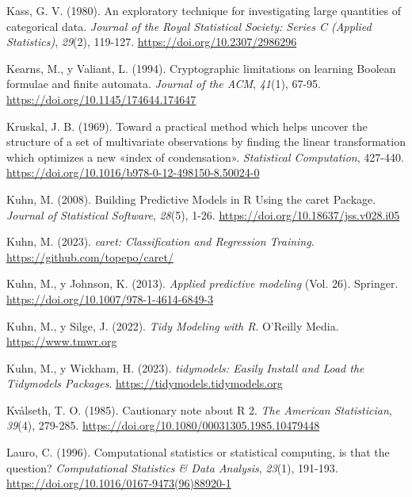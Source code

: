 \documentclass[
]{book}
\newlength{\cslhangindent}
\newlength{\cslentryspacingunit} %
\newenvironment{CSLReferences}[2] %
 {%
  \setlength{\parindent}{0pt}
  \ifodd #1
  \let\oldpar\par
  \def\par{\hangindent=\cslhangindent\oldpar}
  \fi
  \setlength{\parskip}{#2\cslentryspacingunit}
 }%
 {}
\theoremstyle{break}
\theoremstyle{nonumberplain}
\begin{document}
\begin{CSLReferences}{1}{0}
\leavevmode{}%
Kass, G. V. (1980). An exploratory technique for investigating large quantities of categorical data. \emph{Journal of the Royal Statistical Society: Series C (Applied Statistics)}, \emph{29}(2), 119-127. \url{https://doi.org/10.2307/2986296}

\leavevmode{}%
Kearns, M., y Valiant, L. (1994). Cryptographic limitations on learning {Boolean} formulae and finite automata. \emph{Journal of the ACM}, \emph{41}(1), 67-95. \url{https://doi.org/10.1145/174644.174647}

\leavevmode{}%
Kruskal, J. B. (1969). Toward a practical method which helps uncover the structure of a set of multivariate observations by finding the linear transformation which optimizes a new {«index of condensation»}. \emph{Statistical Computation}, 427-440. \url{https://doi.org/10.1016/b978-0-12-498150-8.50024-0}

\leavevmode{}%
Kuhn, M. (2008). Building Predictive Models in R Using the caret Package. \emph{Journal of Statistical Software}, \emph{28}(5), 1-26. \url{https://doi.org/10.18637/jss.v028.i05}

\leavevmode{}%
Kuhn, M. (2023). \emph{caret: Classification and Regression Training}. \url{https://github.com/topepo/caret/}

\leavevmode{}%
Kuhn, M., y Johnson, K. (2013). \emph{Applied predictive modeling} (Vol. 26). Springer. \url{https://doi.org/10.1007/978-1-4614-6849-3}

\leavevmode{}%
Kuhn, M., y Silge, J. (2022). \emph{Tidy Modeling with R}. O'Reilly Media. \url{https://www.tmwr.org}

\leavevmode{}%
Kuhn, M., y Wickham, H. (2023). \emph{tidymodels: Easily Install and Load the Tidymodels Packages}. \url{https://tidymodels.tidymodels.org}

\leavevmode{}%
Kvålseth, T. O. (1985). Cautionary note about R 2. \emph{The American Statistician}, \emph{39}(4), 279-285. \url{https://doi.org/10.1080/00031305.1985.10479448}

\leavevmode{}%
Lauro, C. (1996). Computational statistics or statistical computing, is that the question? \emph{Computational Statistics \& Data Analysis}, \emph{23}(1), 191-193. \url{https://doi.org/10.1016/0167-9473(96)88920-1}


\end{CSLReferences}
\end{document}
